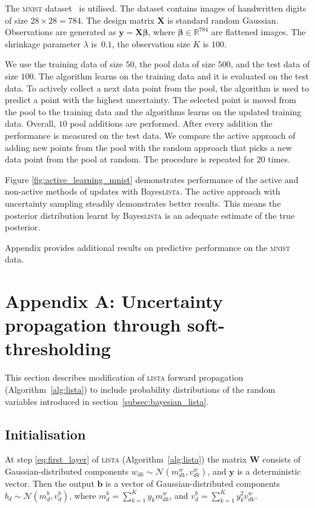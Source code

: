 \documentclass{article}
\begin{document}
 The \textsc{mnist} dataset~\cite{lecun1998gradient} is utilised. The dataset contains images of handwritten digits of size $28 \times 28 = 784$. The design matrix $\mathbf{X}$ is standard random Gaussian. Observations are generated as $\mathbf{y} = \mathbf{X}\boldsymbol\beta$, where $\boldsymbol\beta \in \mathbb{R}^{784}$ are flattened images. The shrinkage parameter $\lambda$ is~$0.1$, the observation size $K$ is $100$.

 We use the training data of size $50$, the pool data of size $500$,  and the test data of size $100$. The algorithm learns on the training data and it is evaluated on the test data. To actively collect a next data point from the pool, the algorithm is used to predict a point with the highest uncertainty. The selected point is moved from the pool to the training data and the algorithms learns on the updated training data. Overall, $10$ pool additions are performed. After every addition the performance is measured on the test data. We compare the active approach of adding new points from the pool with the random approach that picks a new data point from the pool at random. The procedure is repeated for $20$ times.
  
  Figure \ref{fig:active_learning_mnist} demonstrates performance of the active and non-active methods of updates with Bayes\textsc{lista}. The active approach with uncertainty sampling steadily demonstrates better results. This means the posterior distribution learnt by Bayes\textsc{lista} is an adequate estimate of the true posterior.
  
 Appendix provides additional results on predictive performance on the \textsc{mnist} data.
 

{\small


}

\appendix
  \section*{Appendix A: Uncertainty propagation through soft-thresholding}
  \label{sec:fprop}
  This section describes modification of \textsc{lista} forward propagation (Algorithm~\ref{alg:lista}) to include probability distributions of the random variables introduced in section~\ref{subsec:bayesian_lista}. 
  
  \subsection*{Initialisation}
  \label{subsec:forward_init}
  At step \ref{eq:first_layer} of \textsc{lista} (Algorithm~\ref{alg:lista}) the matrix $\mathbf{W}$ consists of Gaussian-distributed components $w_{dk} \sim \mathcal{N}(m^w_{dk}, v^w_{dk})$, and $\mathbf{y}$ is a deterministic vector. Then the output $\mathbf{b}$ is a vector of Gaussian-distributed components $b_d \sim \mathcal{N}(m^b_d, v^b_d)$, where $m^b_d = \sum_{k=1}^Ky_k m^w_{dk}$, and $v^b_d = \sum_{k=1}^Ky_k^2v^w_{dk}$.
  
\end{document}
